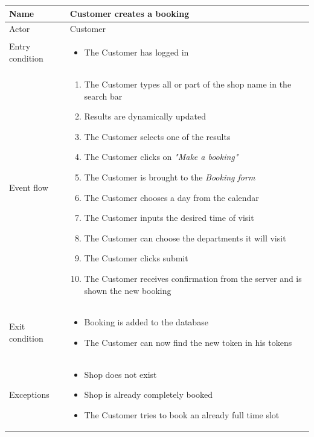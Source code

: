 \begin{table}[H]
    \begin{tabu} to \textwidth {|X|X[4]|}
        \hline
        Name            & Customer creates a booking \\ \hline
        Actor           & Customer                   \\ \hline
        Entry condition & \begin{itemize}
            \item The Customer has logged in
        \end{itemize} \\ \hline
        Event flow      & \begin{enumerate}
            \item The Customer types all or part of the shop name in the search bar
            \item Results are dynamically updated
            \item The Customer selects one of the results
            \item The Customer clicks on \emph{"Make a booking"}
            \item The Customer is brought to the \emph{Booking form}
            \item The Customer chooses a day from the calendar
            \item The Customer inputs the desired time of visit
            \item The Customer can choose the departments it will visit
            \item The Customer clicks submit
            \item The Customer receives confirmation from the server and is shown the new booking
        \end{enumerate} \\ \hline
        Exit condition  & \begin{itemize}
            \item Booking is added to the database
            \item The Customer can now find the new token in his tokens
        \end{itemize} \\ \hline
        Exceptions      & \begin{itemize}
            \item Shop does not exist
            \item Shop is already completely booked
            \item The Customer tries to book an already full time slot
        \end{itemize} \\ \hline
    \end{tabu}
\end{table}

